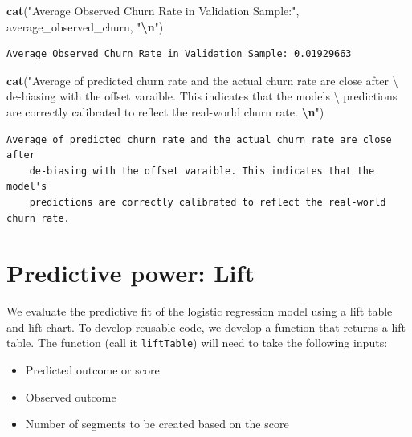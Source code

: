 \documentclass[
]{article}
\newenvironment{Shaded}{\begin{snugshade}}{\end{snugshade}}
\newcommand{\FunctionTok}[1]{\textcolor[rgb]{0.13,0.29,0.53}{\textbf{#1}}}
\newcommand{\NormalTok}[1]{#1}
\newcommand{\SpecialCharTok}[1]{\textcolor[rgb]{0.81,0.36,0.00}{\textbf{#1}}}
\newcommand{\StringTok}[1]{\textcolor[rgb]{0.31,0.60,0.02}{#1}}
\providecommand{\tightlist}{%
  \setlength{\itemsep}{0pt}\setlength{\parskip}{0pt}}
\begin{document}
\begin{Shaded}
\begin{Highlighting}[]
\FunctionTok{cat}\NormalTok{(}\StringTok{"Average Observed Churn Rate in Validation Sample:"}\NormalTok{, average\_observed\_churn, }\StringTok{"}\SpecialCharTok{\textbackslash{}n}\StringTok{"}\NormalTok{)}
\end{Highlighting}
\end{Shaded}

\begin{verbatim}
Average Observed Churn Rate in Validation Sample: 0.01929663 
\end{verbatim}

\begin{Shaded}
\begin{Highlighting}[]
\FunctionTok{cat}\NormalTok{(}\StringTok{"Average of predicted churn rate and the actual churn rate are close after \textbackslash{}}
\StringTok{    de{-}biasing with the offset varaible. This indicates that the model\textquotesingle{}s \textbackslash{}}
\StringTok{    predictions are correctly calibrated to reflect the real{-}world churn rate. }\SpecialCharTok{\textbackslash{}n}\StringTok{"}\NormalTok{)}
\end{Highlighting}
\end{Shaded}

\begin{verbatim}
Average of predicted churn rate and the actual churn rate are close after 
    de-biasing with the offset varaible. This indicates that the model's 
    predictions are correctly calibrated to reflect the real-world churn rate. 
\end{verbatim}

\newpage

\section{Predictive power: Lift}\label{predictive-power-lift}

We evaluate the predictive fit of the logistic regression model using a
lift table and lift chart. To develop reusable code, we develop a
function that returns a lift table. The function (call it
\texttt{liftTable}) will need to take the following inputs:

\begin{itemize}
\tightlist
\item
  Predicted outcome or score
\item
  Observed outcome
\item
  Number of segments to be created based on the score
\end{itemize}
\end{document}
